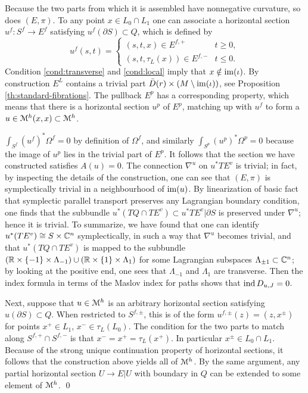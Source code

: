 \documentclass[10pt,letterpaper]{article}
\begin{document}
\proof Because the two parts from which it is assembled have nonnegative
curvature, so does $(E,\pi)$. To any point $x \in L_0 \cap L_1$ one can
associate a horizontal section $u^f: S^f \rightarrow E^f$ satisfying
$u^f(\partial S) \subset Q$, which is defined by
\[
 u^f(s,t) = \begin{cases}
 (s,t,x) \in E^{f,+} & t \geq 0, \\
 (s,t,\tau_L(x)) \in E^{f,-} & t \leq 0.
 \end{cases}
\]
Condition \ref{cond:transverse} and \ref{cond:local} imply that $x \notin
\mathrm{im}(\iota)$. By construction $E^L$ contains a trivial part $\bar{D}(r) \times
(M \setminus \mathrm{im}(\iota))$, see Proposition \ref{th:standard-fibrations}. The
pullback $E^p$ has a corresponding property, which means that there is a
horizontal section $u^p$ of $E^p$, matching up with $u^f$ to form a $u \in
\mathcal{M}^h(x,x) \subset \mathcal{M}^h$.

$\int_{S^f} (u^f)^*\Omega^f = 0$ by definition of $\Omega^f$, and similarly
$\int_{S^p} (u^p)^*\Omega^p = 0$ because the image of $u^p$ lies in the trivial
part of $E^p$. It follows that the section we have constructed satisfies $A(u)
= 0$. The connection $\nabla^u$ on $u^*TE^v$ is trivial; in fact, by inspecting
the details of the construction, one can see that $(E,\pi)$ is symplectically
trivial in a neighbourhood of $\mathrm{im}(u)$. By linearization of basic fact that
symplectic parallel transport preserves any Lagrangian boundary condition, one
finds that the subbundle $u^*(TQ \cap TE^v) \subset u^*TE^v|\partial S$ is
preserved under $\nabla^u$; hence it is trivial. To summarize, we have found
that one can identify $u^*(TE^v) \cong S \times \mathbb{C}^n$ symplectically, in such a
way that $\nabla^u$ becomes trivial, and that $u^*(TQ \cap TE^v)$ is mapped to
the subbundle $(\mathbb{R} \times \{-1\} \times \Lambda_{-1}) \cup (\mathbb{R} \times \{1\}
\times \Lambda_1)$ for some Lagrangian subspaces $\Lambda_{\pm 1} \subset
\mathbb{C}^n$; by looking at the positive end, one sees that $\Lambda_{-1}$ and
$\Lambda_1$ are transverse. Then the index formula in terms of the Maslov index
for paths \cite{robbin-salamon93} shows that $\mathrm{ind}\,D_{u,J} = 0$.

Next, suppose that $u \in \mathcal{M}^h$ is an arbitrary horizontal section satisfying
$u(\partial S) \subset Q$. When restricted to $S^{f,\pm}$, this is of the form
$u^{f,\pm}(z) = (z,x^{\pm})$ for points $x^+ \in L_1$, $x^- \in \tau_L(L_0)$.
The condition for the two parts to match along $S^{f,+} \cap S^{f,-}$ is that
$x^- = x^+ = \tau_L(x^+)$. In particular $x^{\pm} \in L_0 \cap L_1$. Because of
the strong unique continuation property of horizontal sections, it follows that
the construction above yields all of $\mathcal{M}^h$. By the same argument, any partial
horizontal section $U \rightarrow E|U$ with boundary in $Q$ can be extended to
some element of $\mathcal{M}^h$. \qed
\end{document}
